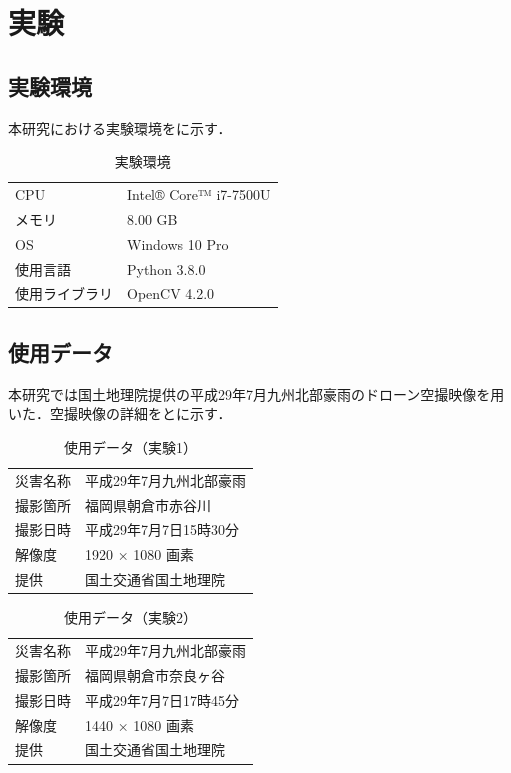 \documentclass[../Thesis]{subfiles}
\begin{document}
\chapter{実験}
\section{実験環境}
本研究における実験環境をに示す．

\begin{table}[tbp]
  \centering
	\caption{実験環境}
	\label{tab03}
	\begin{tabular}{l l}
		\hline
		CPU & Intel® Core™ i7-7500U \\
		メモリ & 8.00 GB \\
		OS & Windows 10 Pro \\
		使用言語 & Python 3.8.0 \\
		使用ライブラリ & OpenCV 4.2.0 \\ \hline
	\end{tabular}
\end{table}

\section{使用データ}
本研究では国土地理院提供の平成29年7月九州北部豪雨のドローン空撮映像\cite{web02}を用いた．空撮映像の詳細をとに示す．

\begin{table}[tbp]
	\centering
	\caption{使用データ（実験1）}
	\label{tab04}
	\begin{tabular}{l l}
		\hline
		災害名称 & 平成29年7月九州北部豪雨 \\
		撮影箇所 & 福岡県朝倉市赤谷川 \\
		撮影日時 & 平成29年7月7日15時30分 \\
		解像度 & 1920 × 1080 画素 \\
		提供 & 国土交通省国土地理院 \\ \hline
	\end{tabular}
\end{table}

\begin{table}[tbp]
	\centering
	\caption{使用データ（実験2）}
	\label{tab05}
	\begin{tabular}{l l}
		\hline
		災害名称 & 平成29年7月九州北部豪雨 \\
		撮影箇所 & 福岡県朝倉市奈良ヶ谷 \\
		撮影日時 & 平成29年7月7日17時45分 \\
		解像度 & 1440 × 1080 画素 \\
		提供 & 国土交通省国土地理院 \\ \hline
	\end{tabular}
\end{table}
\end{document}

